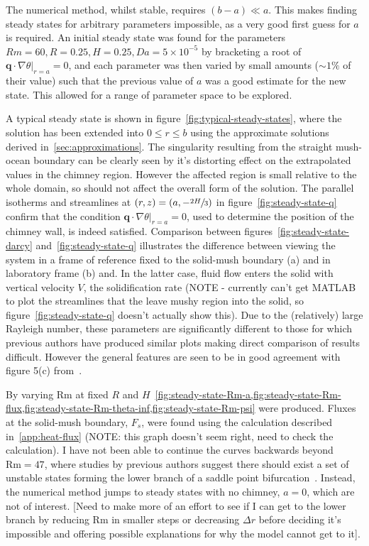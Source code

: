 \documentclass[11pt]{proc}
\begin{document}
The numerical method, whilst stable, requires $(b-a) \ll a$. This makes finding steady states for arbitrary parameters impossible, as a very good first guess for $a$ is required. An initial steady state was found for the parameters $Rm = 60, R=0.25, H=0.25, Da=5\times 10^{-5}$ by bracketing a root of $\left. \mathbf{q} \cdot \nabla \theta \right|_{r=a} = 0$, and each parameter was then varied by small amounts ($\sim 1\%$ of their value) such that the previous value of $a$ was a good estimate for the new state. This allowed for a range of parameter space to be explored.

A typical steady state is shown in figure~\ref{fig:typical-steady-states}, where the solution has been extended into $0 \le r \le b$ using the approximate solutions derived in~\autoref{sec:approximations}. The singularity resulting from the straight mush-ocean boundary can be clearly seen by it's distorting effect on the extrapolated values in the chimney region. However the affected region is small relative to the whole domain, so should not affect the overall form of the solution. The parallel isotherms and streamlines at $(r, z) = (a, -\sfrac{2H}{3})$ in figure~\ref{fig:steady-state-q} confirm that the condition $\left. \mathbf{q} \cdot \nabla \theta \right|_{r=a} = 0$, used to determine the position of the chimney wall, is indeed satisfied. Comparison between figures~\ref{fig:steady-state-darcy} and~\ref{fig:steady-state-q} illustrates the difference between viewing the system in a frame of reference fixed to the solid-mush boundary (a) and in laboratory frame (b) and. In the latter case, fluid flow enters the solid with vertical velocity $V$, the solidification rate (NOTE - currently can't get MATLAB to plot the streamlines that the leave mushy region into the solid, so figure~\ref{fig:steady-state-q} doesn't actually show this). Due to the (relatively) large Rayleigh number, these parameters are significantly different to those for which previous authors have produced similar plots making direct comparison of results difficult. However the general features are seen to be in good agreement with figure 5(c) from~\citet*{schulze-worster-98}.

By varying Rm at fixed $R$ and $H$~\cref{fig:steady-state-Rm-a,fig:steady-state-Rm-flux,fig:steady-state-Rm-theta-inf,fig:steady-state-Rm-psi} were produced. Fluxes at the solid-mush boundary, $F_s$, were found using the calculation described in~\cref{app:heat-flux} (NOTE: this graph doesn't seem right, need to check the calculation). I have not been able to continue the curves backwards beyond $\text{Rm} = 47$, where studies by previous authors suggest there should exist a set of unstable states forming the lower branch of a saddle point bifurcation~\citep*{schulze-worster-98,chung-worster-02}. Instead, the numerical method jumps to steady states with no chimney, $a=0$, which are not of interest. [Need to make more of an effort to see if I can get to the lower branch by reducing Rm in smaller steps or decreasing $\Delta r$ before deciding it's impossible and offering possible explanations for why the model cannot get to it].
\end{document}
